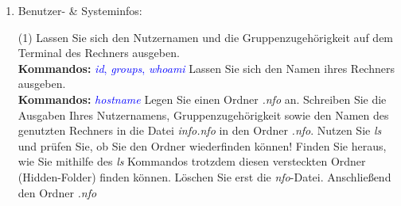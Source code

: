 \documentclass[paper=a4,fontsize=11pt]{scrartcl}%
\numberwithin{equation}{section}
\begin{document}
\begin{enumerate}
\begin{tasks}
		\textbf{Kommandos:} \textcolor{blue}{\emph{head}, \emph{tail}, \emph{more}, \emph{less}}
		\task Öffnen Sie Ihr Cheat-Sheet mithilfe das Programms \emph{gedit} bzw. \emph{retext}. Notieren Sie sich alle Befehle, sowie deren Bedeutung, sodass Sie eine erste Anlaufstelle für die nächsten Übungen haben. Dieses Dokument (Sie können auch mehrere anlegen) sollten Sie fortan als Notizzettel für die Laboraufgaben nutzen!
		\task Navigieren Sie in Ihr Heimatverzeichnis. Legen Sie folgenden Ordner, sowie Unterordner mithilfe des \emph{mkdir}-Kommandos an: .
		\task Kopieren Sie die Datei bzw. den Ordner \emph{shell\_tutorial} in das eben angelegte Verzeichnis.\\
		\textbf{Kommandos:} \textcolor{blue}{\emph{cp} }
        \task Kopieren Sie die Datei(en) inklusive des Ordners  in das Verzeichnis .\\
        \textbf{Hinweise:} Schauen Sie in die Manpage von cp um herauszufinden, wie Ordner kopiert werden können.\\
        \textbf{Kommandos:} \textcolor{blue}{\emph{man cp}}
        \end{tasks}
        \footnote{.md steht für Markdown, welches ein Format für Textdateien ist, ähnlich wie .pdf oder .doc-Dateien.}
        \footnote{\url{https://github.com/retext-project}}
         \footnote{Sie können auch mit vi, vim oder emacs arbeiten!}
  \item Benutzer- \& Systeminfos:
        \begin{tasks}(1)       
          \task Lassen Sie sich den Nutzernamen und die Gruppenzugehörigkeit auf dem Terminal des Rechners ausgeben.\\
          \textbf{Kommandos:} \textcolor{blue}{\emph{id}, \emph{groups}, \emph{whoami}}
          \task Lassen Sie sich den Namen ihres Rechners ausgeben.\\
          \textbf{Kommandos:} \textcolor{blue}{\emph{hostname}}
          \task Legen Sie einen Ordner \emph{.nfo} an. Schreiben Sie die Ausgaben Ihres Nutzernamens, Gruppenzugehörigkeit sowie den Namen des genutzten Rechners in die Datei \emph{info.nfo} in den Ordner \emph{.nfo}.
          \task Nutzen Sie \emph{ls} und prüfen Sie, ob Sie den Ordner wiederfinden können! Finden Sie heraus, wie Sie mithilfe des \emph{ls} Kommandos trotzdem diesen versteckten Ordner (Hidden-Folder) finden können.
          \task Löschen Sie erst die \emph{nfo}-Datei. Anschließend den Ordner \emph{.nfo}\\

\end{tasks}
\end{enumerate}
\end{document}
